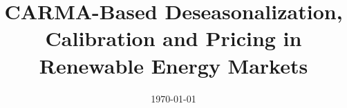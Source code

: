 \documentclass[11pt]{article}
\title{CARMA-Based Deseasonalization, Calibration and Pricing in Renewable Energy Markets}
\author{}
\date{\today}
\begin{document}
\maketitle

\begin{abstract}
\end{abstract}










\end{document}
